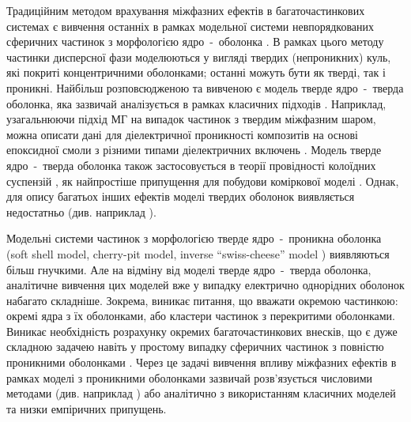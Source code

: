\documentclass[14pt,twoside]{vakthesis}
\begin{document}
Традиційним методом врахування міжфазних ефектів в багаточастинкових системах є вивчення останніх в рамках модельної системи невпорядкованих сферичних частинок з морфологією ядро~-~оболонка \cite{Torquato, Choy}. В рамках цього методу частинки дисперсної фази моделюються у вигляді твердих (непроникних) куль, які покриті концентричними оболонками; останні можуть бути як тверді, так і проникні.
Найбільш розповсюдженою та вивченою є модель тверде ядро~-~тверда оболонка, яка зазвичай аналізується в рамках класичних підходів \cite{Choy,Sihvola1999}. Наприклад, узагальнюючи підхід МГ на випадок частинок з твердим міжфазним шаром, можна описати дані для діелектричної проникності композитів на основі епоксидної смоли з різними типами діелектричних включень \cite{Vo2002}. 
Модель тверде ядро~-~тверда оболонка також застосовується в теорії провідності колоїдних суспензій \cite{Ohshima1982,Lyklema1995}, як найпростіше припущення для побудови коміркової моделі \cite{Lyklema1995,Torquato}.
Однак, для опису багатьох інших ефектів моделі твердих оболонок виявляється недостатньо (див. наприклад \cite{Wiec1994,  Tomylko2015, Singh2018}). 

Модельні системи частинок з морфологією тверде ядро~-~проникна оболонка (soft shell model, cherry-pit model, inverse ``swiss-cheese'' model \cite{Torquato}) виявляються більш гнучкими.
Але на відміну від моделі тверде ядро~-~тверда оболонка, аналітичне вивчення цих моделей вже у випадку електрично однорідних оболонок набагато складніше. Зокрема, виникає питання, що вважати окремою частинкою: окремі ядра з їх оболонками, або кластери частинок з перекритими оболонками. Виникає необхідність розрахунку окремих багаточастинкових внесків, що є дуже складною задачею навіть у простому випадку сферичних частинок з повністю проникними оболонками \cite{Torquato}. 
Через це задачі вивчення впливу міжфазних ефектів в рамках моделі з проникними оболонками зазвичай розв'язується числовими методами (див. наприклад \cite{Myroshnychenko2008,Myroshnychenko2009}) або аналітично з використанням класичних моделей та низки емпіричних припущень.
\end{document}
